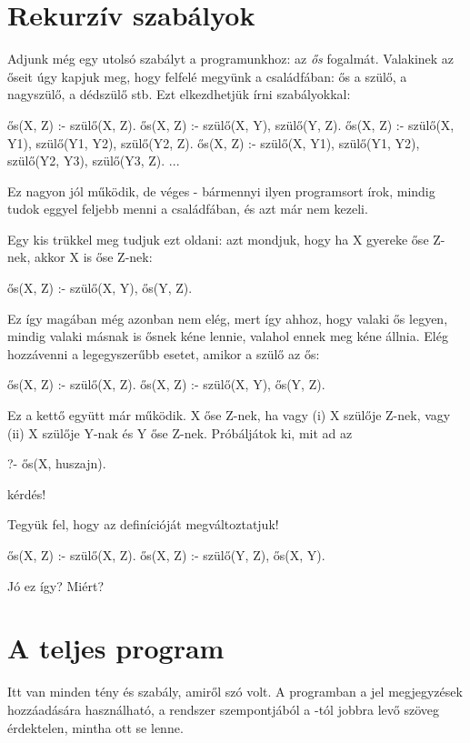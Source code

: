 \section{Rekurzív szabályok}

Adjunk még egy utolsó szabályt a programunkhoz: az \emph{ős} fogalmát. Valakinek az őseit úgy kapjuk meg, hogy felfelé megyünk a családfában: ős a szülő, a nagyszülő, a dédszülő stb. Ezt elkezdhetjük írni szabályokkal:
\begin{prolog}
ős(X, Z) :- szülő(X, Z).
ős(X, Z) :- szülő(X, Y), szülő(Y, Z).
ős(X, Z) :- szülő(X, Y1), szülő(Y1, Y2), szülő(Y2, Z).
ős(X, Z) :- szülő(X, Y1), szülő(Y1, Y2), szülő(Y2, Y3), szülő(Y3, Z).
...
\end{prolog}
Ez nagyon jól működik, de véges - bármennyi ilyen programsort írok, mindig tudok eggyel feljebb menni a családfában, és azt már nem kezeli.

Egy kis trükkel meg tudjuk ezt oldani: azt mondjuk, hogy ha X gyereke őse Z-nek, akkor X is őse Z-nek:
\begin{prolog}
ős(X, Z) :- szülő(X, Y), ős(Y, Z).
\end{prolog}
Ez így magában még azonban nem elég, mert így ahhoz, hogy valaki ős legyen, mindig valaki másnak is ősnek kéne lennie, valahol ennek meg kéne állnia. Elég hozzávenni a legegyszerűbb esetet, amikor a szülő az ős:
\begin{prolog}
ős(X, Z) :- szülő(X, Z).
ős(X, Z) :- szülő(X, Y), ős(Y, Z).
\end{prolog}
Ez a kettő együtt már működik. X őse Z-nek, ha vagy (i) X szülője Z-nek, vagy (ii) X szülője Y-nak és Y őse Z-nek. Próbáljátok ki, mit ad az
\begin{prolog}
?- ős(X, huszajn).
\end{prolog}
kérdés!

\begin{problem}
Tegyük fel, hogy az  definícióját megváltoztatjuk!
\begin{prolog}
ős(X, Z) :- szülő(X, Z).
ős(X, Z) :- szülő(Y, Z), ős(X, Y).
\end{prolog}
Jó ez így? Miért?
\end{problem}

\section*{A teljes program}

Itt van minden tény és szabály, amiről szó volt. A
programban a \pr{\%} jel megjegyzések hozzáadására
használható, a rendszer szempontjából a \pr{\%}-tól
jobbra levő szöveg érdektelen, mintha ott se
lenne.

